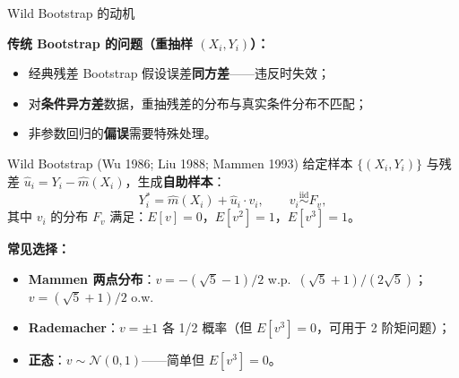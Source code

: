 \documentclass[aspectratio=169, 10pt]{beamer}
\begin{document}
\begin{frame}{Wild Bootstrap 的动机}

  \textbf{传统 Bootstrap 的问题（重抽样 $(X_i, Y_i)$）：}
  \begin{itemize}
    \item 经典残差 Bootstrap 假设误差\textbf{同方差}——违反时失效；
    \item 对\textbf{条件异方差}数据，重抽残差的分布与真实条件分布不匹配；
    \item 非参数回归的\textbf{偏误}需要特殊处理。
  \end{itemize}

  \begin{definitionbox}{{Wild Bootstrap (Wu 1986; Liu 1988; Mammen 1993)}}
    给定样本 $\{(X_i, Y_i)\}$ 与残差 $\hat u_i = Y_i - \hat m(X_i)$，生成\textbf{自助样本}：
    \[
      Y_i^* = \hat m(X_i) + \hat u_i \cdot v_i,\qquad v_i \overset{\text{iid}}{\sim} F_v,
    \]
    其中 $v_i$ 的分布 $F_v$ 满足：$E[v]=0$，$E[v^2]=1$，$E[v^3]=1$。
  \end{definitionbox}

  \vspace{0.3em}

  \textbf{常见选择：}
  \begin{itemize}
    \item \textbf{Mammen 两点分布}：$v = -(\sqrt 5 - 1)/2$ w.p.\ $(\sqrt 5 + 1)/(2\sqrt 5)$；$v = (\sqrt 5 + 1)/2$ o.w.
    \item \textbf{Rademacher}：$v = \pm 1$ 各 1/2 概率（但 $E[v^3]=0$，可用于 2 阶矩问题）；
    \item \textbf{正态}：$v\sim \mathcal{N}(0,1)$——简单但 $E[v^3]=0$。
  \end{itemize}

\end{frame}
\end{document}
